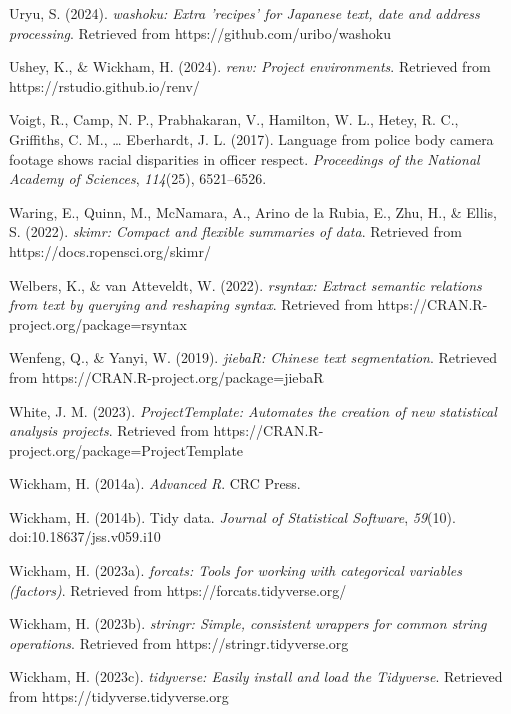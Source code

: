\documentclass[
  letterpaper,
  krantz1]{latex/krantz-mod}
\newlength{\cslhangindent}
\newenvironment{CSLReferences}[2] %
 {\begin{list}{}{%
  \setlength{\itemindent}{0pt}
  \setlength{\leftmargin}{0pt}
  \setlength{\parsep}{0pt}
  \ifodd #1
   \setlength{\leftmargin}{\cslhangindent}
   \setlength{\itemindent}{-1\cslhangindent}
  \fi
  \setlength{\itemsep}{#2\baselineskip}}}
 {\end{list}}
\theoremstyle{definition}
\theoremstyle{definition}
\theoremstyle{remark}
\begin{document}
\begin{CSLReferences}{1}{0}
Uryu, S. (2024). \emph{{washoku}: Extra 'recipes' for {J}apanese text,
date and address processing}. Retrieved from
https://github.com/uribo/washoku

Ushey, K., \& Wickham, H. (2024). \emph{{renv}: Project environments}.
Retrieved from https://rstudio.github.io/renv/

Voigt, R., Camp, N. P., Prabhakaran, V., Hamilton, W. L., Hetey, R. C.,
Griffiths, C. M., \ldots{} Eberhardt, J. L. (2017). Language from police
body camera footage shows racial disparities in officer respect.
\emph{Proceedings of the National Academy of Sciences}, \emph{114}(25),
6521--6526.

Waring, E., Quinn, M., McNamara, A., Arino de la Rubia, E., Zhu, H., \&
Ellis, S. (2022). \emph{{skimr}: Compact and flexible summaries of
data}. Retrieved from https://docs.ropensci.org/skimr/

Welbers, K., \& van Atteveldt, W. (2022). \emph{{rsyntax}: Extract
semantic relations from text by querying and reshaping syntax}.
Retrieved from https://CRAN.R-project.org/package=rsyntax

Wenfeng, Q., \& Yanyi, W. (2019). \emph{{jiebaR}: {Chinese} text
segmentation}. Retrieved from https://CRAN.R-project.org/package=jiebaR

White, J. M. (2023). \emph{{ProjectTemplate}: Automates the creation of
new statistical analysis projects}. Retrieved from
https://CRAN.R-project.org/package=ProjectTemplate

Wickham, H. (2014a). \emph{Advanced {R}}. CRC Press.

Wickham, H. (2014b). Tidy data. \emph{Journal of Statistical Software},
\emph{59}(10). doi:10.18637/jss.v059.i10

Wickham, H. (2023a). \emph{{forcats}: Tools for working with categorical
variables (factors)}. Retrieved from https://forcats.tidyverse.org/

Wickham, H. (2023b). \emph{{stringr}: Simple, consistent wrappers for
common string operations}. Retrieved from https://stringr.tidyverse.org

Wickham, H. (2023c). \emph{{tidyverse}: Easily install and load the
{Tidyverse}}. Retrieved from https://tidyverse.tidyverse.org


\end{CSLReferences}
\end{document}
